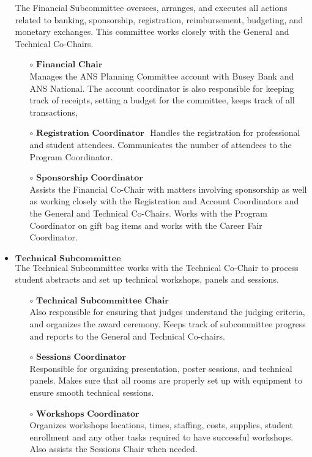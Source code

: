 \begin{itemize}
	The Financial Subcommittee oversees, arranges, and executes all actions related to banking, sponsorship, registration, reimbursement, budgeting, and monetary exchanges. This committee works closely with the General and Technical Co-Chairs.
	\begin{itemize}
		\item[$\circ$] $\textbf{Financial Chair}$\\
		Manages the ANS Planning Committee account with Busey Bank and ANS National. The account coordinator is also responsible for keeping track of receipts, setting a budget for the committee, keeps track of all transactions,
		\item[$\circ$] $\textbf{Registration Coordinator }$
		Handles the registration for professional and student attendees. Communicates the number of attendees to the Program Coordinator.
		\item[$\circ$] $\textbf{Sponsorship Coordinator}$\\
		Assists the Financial Co-Chair with matters involving sponsorship as well as working closely with the Registration and Account Coordinators and the General and Technical Co-Chairs. Works with the Program Coordinator on gift bag items and works with the Career Fair Coordinator.
	\end{itemize}
	\item $\textbf{Technical Subcommittee}$\\
	The Technical Subcommittee works with the Technical Co-Chair to process student abstracts and set up
	technical workshops, panels and sessions.
	\begin{itemize}
		\item[$\circ$] $\textbf{Technical Subcommittee Chair}$\\
		 Also responsible for ensuring that judges understand the judging criteria, and organizes the award ceremony.
		Keeps track of subcommittee progress and reports to the General and Technical Co-chairs.
		\item[$\circ$] $\textbf{Sessions Coordinator}$\\
		Responsible for organizing presentation, poster sessions, and technical
		panels. Makes sure that all rooms are properly set up with equipment to ensure smooth technical sessions.
		\item[$\circ$] $\textbf{Workshops Coordinator}$\\
		Organizes workshops locations, times, staffing, costs, supplies, student enrollment
		and any other tasks required to have successful workshops. Also assists the Sessions Chair when needed.

\end{itemize}
\end{itemize}
